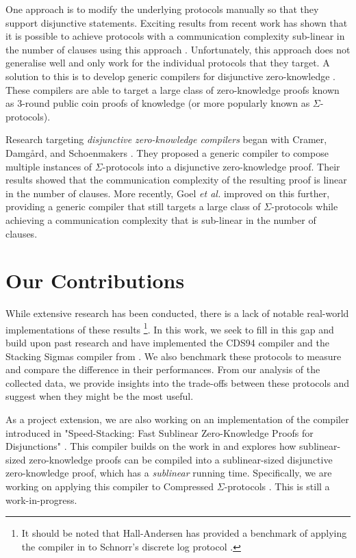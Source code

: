 One approach is to modify the underlying protocols manually so that they support disjunctive statements. Exciting results from recent 
work has shown that it is possible to achieve protocols with a communication complexity sub-linear in the number of clauses using 
this approach \cite{StackedGF,attema}. Unfortunately, this approach does not generalise well and only work for the individual protocols 
that they target. A solution to this is to develop generic compilers for disjunctive zero-knowledge \cite{CDS94,StackingSigmas}. These 
compilers are able to target a large class of zero-knowledge proofs known as 3-round public coin proofs of knowledge (or more popularly 
known as $\Sigma$-protocols).

Research targeting \textit{disjunctive zero-knowledge compilers} began with Cramer, Damg{\aa}rd, and Schoenmakers \cite{CDS94}. 
They proposed a generic compiler to compose multiple instances of $\Sigma$-protocols into a disjunctive zero-knowledge proof. 
Their results showed that the communication complexity of the resulting proof is linear in the number of clauses.
More recently, Goel {\em et al.} \cite{StackingSigmas} improved on this further, providing a generic compiler that still targets 
a large class of $\Sigma$-protocols while achieving a communication complexity that is sub-linear in the number of clauses.

\section{Our Contributions}

While extensive research has been conducted, there is a lack of notable real-world implementations 
of these results
\footnote{It should be noted that Hall-Andersen \cite{MHAStackSig} has provided a benchmark of applying the compiler in 
\cite{StackingSigmas} to Schnorr's discrete log protocol \cite{Schnorr}.}. 
In this work, we seek to fill in this gap and build upon past research and have implemented
the CDS94 compiler \cite{CDS94} and the Stacking Sigmas compiler from \cite{StackingSigmas}. 
We also benchmark these protocols to measure and compare the difference in their performances. 
From our analysis of the collected data, we provide insights into the trade-offs between these 
protocols and suggest when they might be the most useful. 

As a project extension, we are also working on an implementation of the compiler 
introduced in "Speed-Stacking: Fast Sublinear Zero-Knowledge Proofs for Disjunctions" 
\cite{SpeedStacking}. This compiler builds on the work in \cite{StackingSigmas} and 
explores how sublinear-sized zero-knowledge proofs can be compiled into a 
sublinear-sized disjunctive zero-knowledge proof, which has a \textit{sublinear} 
running time. Specifically, we are working on applying this compiler to Compressed 
$\Sigma$-protocols \cite{attema}. This is still a work-in-progress.

